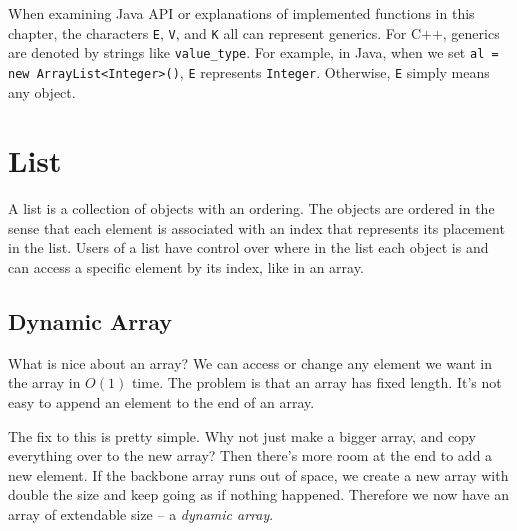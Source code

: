 When examining Java API or explanations of implemented functions in this chapter, the characters \texttt{E}, \texttt{V}, and \texttt{K} all can represent generics. For C++, generics are denoted by strings like \texttt{value\_type}. For example, in Java, when we set \texttt{al = new ArrayList<Integer>()}, \texttt{E} represents \texttt{Integer}. Otherwise, \texttt{E} simply means any object.

\section{List}

A list is a collection of objects with an ordering. The objects are ordered in the sense that each element is associated with an index that represents its placement in the list. Users of a list have control over where in the list each object is and can access a specific element by its index, like in an array.

\subsection{Dynamic Array}

What is nice about an array? We can access or change any element we want in the array in $O(1)$ time. The problem is that an array has fixed length. It's not easy to append an element to the end of an array.

The fix to this is pretty simple. Why not just make a bigger array, and copy everything over to the new array? Then there's more room at the end to add a new element. If the backbone array runs out of space, we create a new array with double the size and keep going as if nothing happened. Therefore we now have an array of extendable size -- a \textit{dynamic array}.

